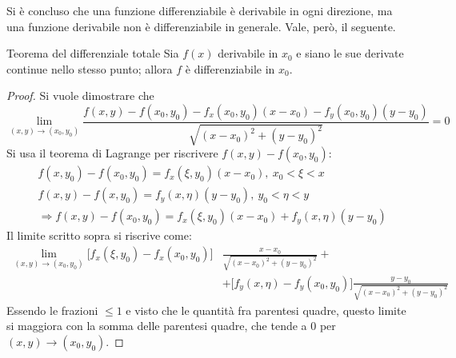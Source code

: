 \documentclass[11pt, a4paper]{scrartcl}
\theoremstyle{definition}
\numberwithin{esempio}{section}
\theoremstyle{definition}
\numberwithin{obs}{section}
\numberwithin{nota}{section}
\numberwithin{equation}{subsection}
\begin{document}
Si \`e concluso che una funzione differenziabile \`e derivabile in ogni direzione, ma una funzione derivabile non \`e differenziabile in generale. Vale, per\`o, il seguente.
\begin{teorema}
	{Teorema del differenziale totale}{}
	Sia $f(x)$ derivabile in $x_0$ e siano le sue derivate continue nello stesso punto; allora $f$ \`e differenziabile in $x_0$.
	\begin{proof}
		Si vuole dimostrare che
		\[
		\lim_{(x,y) \to (x_0,y_0)} \frac{f(x,y) - f(x_0,y_0) - f_x(x_0,y_0) (x-x_0) - f_y(x_0,y_0)(y-y_0)}{\sqrt{(x-x_0)^2 + (y-y_0)^2} } = 0
		\] 
		Si usa il teorema di Lagrange per riscrivere $f(x,y) - f(x_0,y_0)$:
		\[
		\begin{split}
			&f(x,y_0) - f(x_0,y_0) = f_x(\xi ,y_0) (x-x_0),\ x_0<\xi <x\\
			&f(x,y) - f(x,y_0) = f_y(x ,\eta) (y-y_0), \ y_0 < \eta < y\\
			&\Rightarrow f(x,y) - f(x_0,y_0) = f_x(\xi ,y_0) (x-x_0) + f_y(x,\eta) (y-y_0)
		\end{split}
		\] 
	Il limite scritto sopra si riscrive come:
	\[
		\begin{split}
			\lim_{(x,y) \to (x_0,y_0)} \big[f_x(\xi ,y_0) - f_x(x_0,y_0)\big] &\frac{x-x_0}{\sqrt{(x-x_0)^2 + (y-y_0)^2} } + \\ 
											  &+\big[f_y(x,\eta) - f_y(x_0,y_0)\big] \frac{y-y_0}{\sqrt{(x-x_0)^2 + (y-y_0)^2} }
		\end{split}
	\] 
	Essendo le frazioni $\le 1$ e visto che le quantit\`a fra parentesi quadre, questo limite si maggiora con la somma delle parentesi quadre, che tende a $0$ per $(x,y) \to (x_0,y_0)$.
	\end{proof}
\end{teorema}
\end{document}
